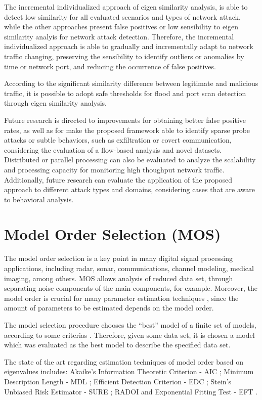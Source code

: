 \documentclass[review]{elsarticle}
\begin{document}
The incremental individualized approach of eigen similarity analysis, is able to detect low similarity for all evaluated scenarios and types of network attack, while the other approaches present false positives or low sensibility to eigen similarity analyis for network attack detection. Therefore, the incremental individualized approach is able to gradually and incrementally adapt to network traffic changing, preserving the sensibility to identify outliers or anomalies by time or network port, and reducing the occurrence of false positives.

According to the significant similarity difference between legitimate and malicious traffic, it is possible to adopt safe thresholds for flood and port scan detection through eigen similarity analysis.

Future research is directed to improvements for obtaining better false positive rates, as well as for make the proposed framework able to identify sparse probe attacks or subtle behaviors, such as exfiltration or covert communication, considering the evaluation of a flow-based analysis and novel datasets. Distributed or parallel processing can also be evaluated to analyze the scalability and processing capacity for monitoring high thoughput network traffic. Additionally, future research can evaluate the application of the proposed approach to different attack types and domains, considering cases that are aware to behavioral analysis.

\appendix

\section{Model Order Selection (MOS)}
\label{sec:mos}
The model order selection is a key point in many digital signal processing applications, including radar, sonar, communications, channel modeling, medical imaging, among others. MOS allows analysis of reduced data set, through separating noise components of the main components, for example. Moreover, the model order is crucial for many parameter estimation techniques \cite{da2009comparison}, since the amount of parameters to be estimated depends on the model order.

The model selection procedure chooses the ``best'' model of a finite set of models, according to some criterias \cite{rajan1997model}. Therefore, given some data set, it is chosen a model which was evaluated as the best model to describe the specified data set.

The state of the art regarding estimation techniques of model order based on eigenvalues includes: Akaike's Information Theoretic Criterion - AIC \cite{akaike1974new,wax1985detection}; Minimum Description Length - MDL \cite{barron1998minimum,wax1985detection}; Efficient Detection Criterion - EDC \cite{zhao1986detection}; Stein's Unbiased Risk Estimator - SURE \cite{ulfarsson2008rank}; RADOI \cite{radoi2004new} and Exponential Fitting Test - EFT \cite{grouffaud1996some,quinlan2006model,david2011blind}.
\end{document}
